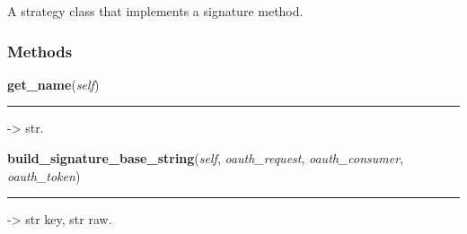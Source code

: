 A strategy class that implements a signature method.



  \subsubsection{Methods}

    \label{lib:oauth:OAuthSignatureMethod:get_name}

    \vspace{0.5ex}

\hspace{.8\funcindent}\begin{boxedminipage}{\funcwidth}

    \raggedright \textbf{get\_name}(\textit{self})

    \vspace{-1.5ex}

    \rule{\textwidth}{0.5\fboxrule}
\setlength{\parskip}{2ex}
    -{\textgreater} str.

\setlength{\parskip}{1ex}
    \end{boxedminipage}

    \label{lib:oauth:OAuthSignatureMethod:build_signature_base_string}

    \vspace{0.5ex}

\hspace{.8\funcindent}\begin{boxedminipage}{\funcwidth}

    \raggedright \textbf{build\_signature\_base\_string}(\textit{self}, \textit{oauth\_request}, \textit{oauth\_consumer}, \textit{oauth\_token})

    \vspace{-1.5ex}

    \rule{\textwidth}{0.5\fboxrule}
\setlength{\parskip}{2ex}
    -{\textgreater} str key, str raw.

\setlength{\parskip}{1ex}
    \end{boxedminipage}

